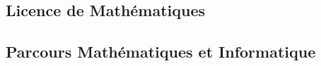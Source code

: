 \documentclass[10pt, a5paper]{report}
\begin{document}
\begin{spacing}{1.5}

\chapter*{Licence de Mathématiques}

\vfill
\section*{Parcours Mathématiques et Informatique}
\vfill


\end{spacing}
\end{document}
